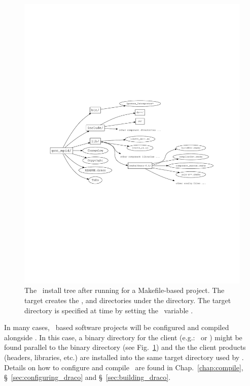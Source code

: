 \begin{figure}
  \centerline{\includegraphics[clip,trim=2.5cm 9.5cm 2.5cm 9.5cm,width=6.5in]{fig/build_tree_post_install}}
  \caption{The \draco\ install tree after running  for a Makefile-based project.  The  target creates  the ,  and  directories under the   directory.  The target directory is specified at  time by setting the \cmake\ variable .}
  \label{fig:build_tree_post_install}
\end{figure}


In many cases, \draco\ based software projects will be configured and compiled alongside \draco.  In this case, a binary directory for the client (e.g.: \clubimc\ or \capsaicin) might be found parallel to the  binary directory (see Fig.~\ref{fig:build_tree_post_install}) and the the client products (headers, libraries, etc.) are installed into the same target directory used by \draco.  Details on how to configure and compile \draco\ are found in Chap.~\ref{chap:compile}, \S~\ref{sec:configuring_draco} and \S~\ref{sec:building_draco}.

